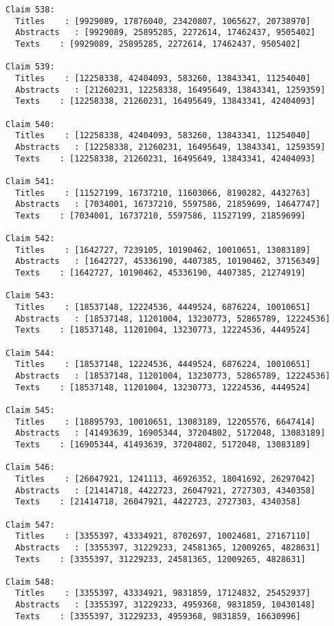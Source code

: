 \documentclass[11pt]{article}
\begin{document}
\begin{Verbatim}[commandchars=\\\{\}]
Claim 538:
  Titles    : [9929089, 17876040, 23420807, 1065627, 20738970]
  Abstracts   : [9929089, 25895285, 2272614, 17462437, 9505402]
  Texts    : [9929089, 25895285, 2272614, 17462437, 9505402]

Claim 539:
  Titles    : [12258338, 42404093, 583260, 13843341, 11254040]
  Abstracts   : [21260231, 12258338, 16495649, 13843341, 1259359]
  Texts    : [12258338, 21260231, 16495649, 13843341, 42404093]

Claim 540:
  Titles    : [12258338, 42404093, 583260, 13843341, 11254040]
  Abstracts   : [12258338, 21260231, 16495649, 13843341, 1259359]
  Texts    : [12258338, 21260231, 16495649, 13843341, 42404093]

Claim 541:
  Titles    : [11527199, 16737210, 11603066, 8190282, 4432763]
  Abstracts   : [7034001, 16737210, 5597586, 21859699, 14647747]
  Texts    : [7034001, 16737210, 5597586, 11527199, 21859699]

Claim 542:
  Titles    : [1642727, 7239105, 10190462, 10010651, 13083189]
  Abstracts   : [1642727, 45336190, 4407385, 10190462, 37156349]
  Texts    : [1642727, 10190462, 45336190, 4407385, 21274919]

Claim 543:
  Titles    : [18537148, 12224536, 4449524, 6876224, 10010651]
  Abstracts   : [18537148, 11201004, 13230773, 52865789, 12224536]
  Texts    : [18537148, 11201004, 13230773, 12224536, 4449524]

Claim 544:
  Titles    : [18537148, 12224536, 4449524, 6876224, 10010651]
  Abstracts   : [18537148, 11201004, 13230773, 52865789, 12224536]
  Texts    : [18537148, 11201004, 13230773, 12224536, 4449524]

Claim 545:
  Titles    : [18895793, 10010651, 13083189, 12205576, 6647414]
  Abstracts   : [41493639, 16905344, 37204802, 5172048, 13083189]
  Texts    : [16905344, 41493639, 37204802, 5172048, 13083189]

Claim 546:
  Titles    : [26047921, 1241113, 46926352, 18041692, 26297042]
  Abstracts   : [21414718, 4422723, 26047921, 2727303, 4340358]
  Texts    : [21414718, 26047921, 4422723, 2727303, 4340358]

Claim 547:
  Titles    : [3355397, 43334921, 8702697, 10024681, 27167110]
  Abstracts   : [3355397, 31229233, 24581365, 12009265, 4828631]
  Texts    : [3355397, 31229233, 24581365, 12009265, 4828631]

Claim 548:
  Titles    : [3355397, 43334921, 9831859, 17124832, 25452937]
  Abstracts   : [3355397, 31229233, 4959368, 9831859, 10430148]
  Texts    : [3355397, 31229233, 4959368, 9831859, 16630996]


\end{Verbatim}
\end{document}
